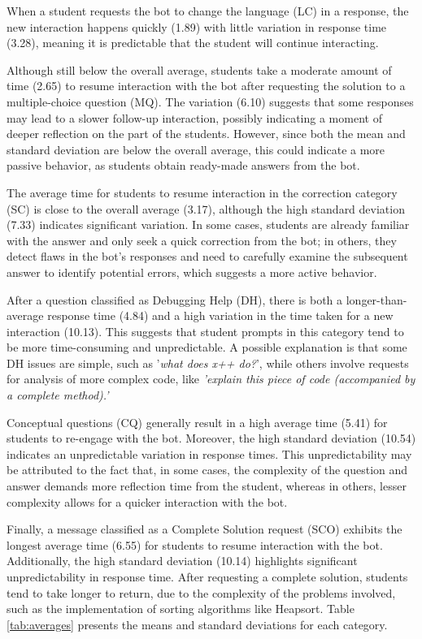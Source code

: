 \documentclass[a4paper,twoside]{article}
\begin{document}
When a student requests the bot to change the language (LC) in a response, the
new interaction happens quickly (1.89) with little variation in response time
(3.28), meaning it is predictable that the student will continue interacting.

Although still below the overall average, students take a moderate amount of
time (2.65) to resume interaction with the bot after requesting the solution to
a multiple-choice question (MQ). The variation (6.10) suggests that some
responses may lead to a slower follow-up interaction, possibly indicating a
moment of deeper reflection on the part of the students. However, since both the
mean and standard deviation are below the overall average, this could indicate
a more passive behavior, as students obtain ready-made answers from the bot.

The average time for students to resume interaction in the correction category
(SC) is close to the overall average (3.17), although the high standard
deviation (7.33) indicates significant variation. In some cases, students are
already familiar with the answer and only seek a quick correction from the bot;
in others, they detect flaws in the bot's responses and need to carefully
examine the subsequent answer to identify potential errors, which suggests a
more active behavior.

After a question classified as Debugging Help (DH), there is both a
longer-than-average response time (4.84) and a high variation in the time taken
for a new interaction (10.13). This suggests that student prompts in this
category tend to be more time-consuming and unpredictable. A possible
explanation is that some DH issues are simple, such as '\textit{what does x++ do?}',
while others involve requests for analysis of more complex code, like
\textit{'explain this piece of code (accompanied by a complete method).'}

Conceptual questions (CQ) generally result in a high average time (5.41) for
students to re-engage with the bot. Moreover, the high standard deviation
(10.54) indicates an unpredictable variation in response times. This
unpredictability may be attributed to the fact that, in some cases, the
complexity of the question and answer demands more reflection time from the
student, whereas in others, lesser complexity allows for a quicker interaction
with the bot.

Finally, a message classified as a Complete Solution request (SCO) exhibits the
longest average time (6.55) for students to resume interaction with the bot.
Additionally, the high standard deviation (10.14) highlights significant
unpredictability in response time. After requesting a complete solution,
students tend to take longer to return, due to the complexity of the problems
involved, such as the implementation of sorting algorithms like Heapsort. Table
\ref{tab:averages} presents the means and standard deviations for each
category.
\end{document}
